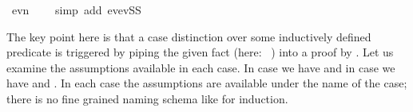 \begin{isabellebody}
\ {}ev{}n\ {}\ {}{}{}\ \isamarkupfalse%
\ {}simp\ add{}\ ev{}evSS{}\isanewline
\ \ \isamarkupfalse%
%
\endisatagproof
{\isafoldproof}%
%
\isadelimproof
%
\endisadelimproof
%
\begin{isamarkuptext}%
The key point here is that a case distinction over some inductively
defined predicate is triggered by piping the given fact
(here: ~) into a proof by .
Let us examine the assumptions available in each case. In case 
we have  and in case  we have 
and . In each case the assumptions are available under the name
of the case; there is no fine grained naming schema like for induction.


\end{isamarkuptext}
\end{isabellebody}
